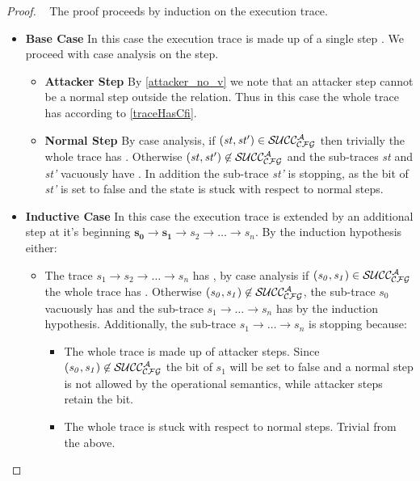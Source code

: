 \begin{proof}
  ~ The proof proceeds by induction on the execution trace.
  \begin{itemize}
  \item \textbf{Base Case} In this case the execution trace is made up
    of a single step . We proceed with case analysis on
    the step.
    \begin{itemize}
    \item \textbf{Attacker Step} By \cref{attacker_no_v} we
      note that an attacker step cannot be a normal step outside the
       relation. Thus in this case the whole trace has \CFI
      according to \cref{traceHasCfi}.
    \item \textbf{Normal Step} By case analysis, if
      $(\mathit{st},\mathit{st'}) \in \mathcal{SUCC_\mathcal{CFG}^{A}}$ then trivially the
      whole trace has \CFI. Otherwise $(\mathit{st},\mathit{st'}) \not
      \in \mathcal{SUCC_\mathcal{CFG}^{A}}$ and the sub-traces \textit{st} and \textit{st'}
      vacuously have \CFI. In addition the sub-trace \textit{st'} is
      stopping, as the \ok bit of \textit{st'} is set to false and the
      state is stuck with respect to normal steps.
    \end{itemize}
  \item \textbf{Inductive Case} In this case the execution trace is
    extended by an additional step at it's beginning
    $\mathbf{s_0 \to s_1} \to s_2 \to \ldots \to s_n$.
    By the induction hypothesis either:
    \begin{itemize}
    \item The trace $s_1 \to s_2 \to \ldots \to s_n$ has \CFI, by case
      analysis if $(\mathit{s_0},\mathit{s_1}) \in \mathcal{SUCC_\mathcal{CFG}^{A}}$ the
      whole trace has \CFI. Otherwise $(\mathit{s_0},\mathit{s_1})
      \not \in \mathcal{SUCC_\mathcal{CFG}^{A}}$, the sub-trace $s_0$ vacuously has \CFI and
      the sub-trace $s_1 \to \ldots \to s_n$ has \CFI by the induction
      hypothesis. Additionally, the sub-trace $s_1 \to \ldots \to s_n$
      is stopping because:
      \begin{itemize}
        \item The whole trace is made up of attacker steps.
           Since $(\mathit{s_0},\mathit{s_1}) \not \in \mathcal{SUCC_\mathcal{CFG}^{A}}$
           the \ok bit of $s_1$ will be set to false and a normal
           step is not allowed by the operational semantics,
           while attacker steps retain the \ok bit.
         \item The whole trace is stuck with respect to normal steps.
           Trivial from the above.

\end{itemize}
\end{itemize}
\end{itemize}
\end{proof}
